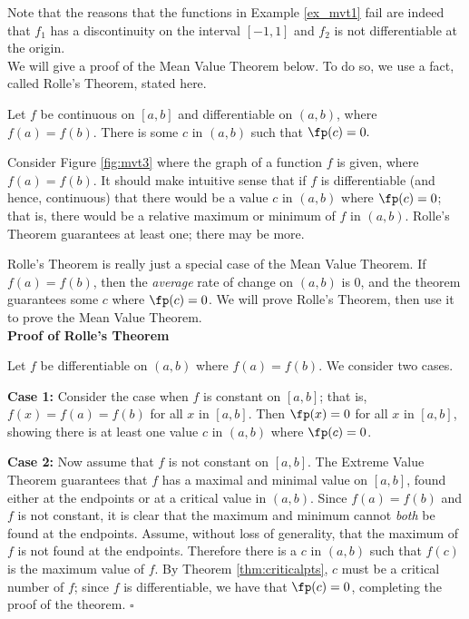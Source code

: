 Note that the reasons that the functions in Example \ref{ex_mvt1} fail are indeed that $f_1$ has a discontinuity on the interval $[-1,1]$ and $f_2$ is not differentiable at the origin.\\

We will give a proof of the Mean Value Theorem below. To do so, we use a fact, called Rolle's Theorem, stated here.

{Let $f$ be continuous on $[a,b]$ and differentiable on $(a,b)$, where $f(a) = f(b)$. There is some $c$ in $(a,b)$ such that $\fp(c) = 0.$}

Consider Figure \ref{fig:mvt3} where the graph of a function $f$ is given, where $f(a) = f(b)$. It should make intuitive sense that if $f$ is differentiable (and hence, continuous) that there would be a value $c$ in $(a,b)$ where $\fp(c)=0$; that is, there would be a relative maximum or minimum of $f$ in $(a,b)$. Rolle's Theorem guarantees at least one; there may be more. 


Rolle's Theorem is really just a special case of the Mean Value Theorem. If $f(a) = f(b)$, then the \textit{average} rate of change on $(a,b)$ is $0$, and the theorem guarantees some $c$ where $\fp(c)=0$. We will prove Rolle's Theorem, then use it to prove the Mean Value Theorem.\\

\noindent\textbf{Proof of Rolle's Theorem}

Let $f$ be differentiable on $(a,b)$ where $f(a)=f(b)$. We consider two cases. 

\noindent\textbf{Case 1:} Consider the case when $f$ is constant on $[a,b]$; that is, $f(x) = f(a) = f(b)$ for all $x$ in $[a,b]$. Then $\fp(x) = 0$ for all $x$ in $[a,b]$, showing there is at least one value $c$ in $(a,b)$ where $\fp(c)=0$.

\noindent\textbf{Case 2:} Now assume that $f$ is not constant on $[a,b]$. The Extreme Value Theorem guarantees that $f$ has a maximal and minimal value on $[a,b]$, found either at the endpoints or at a critical value in $(a,b)$. Since $f(a)=f(b)$ and $f$ is not constant, it is clear that the maximum and minimum cannot \textit{both} be found at the endpoints. Assume, without loss of generality, that the maximum of $f$ is not found at the endpoints. Therefore there is a $c$ in $(a,b)$ such that $f(c)$ is the maximum value of $f$. By Theorem \ref{thm:criticalpts}, $c$ must be a critical number of $f$; since $f$ is differentiable, we have that $\fp(c) = 0$, completing the proof of the theorem. \hfill $\square$\\

